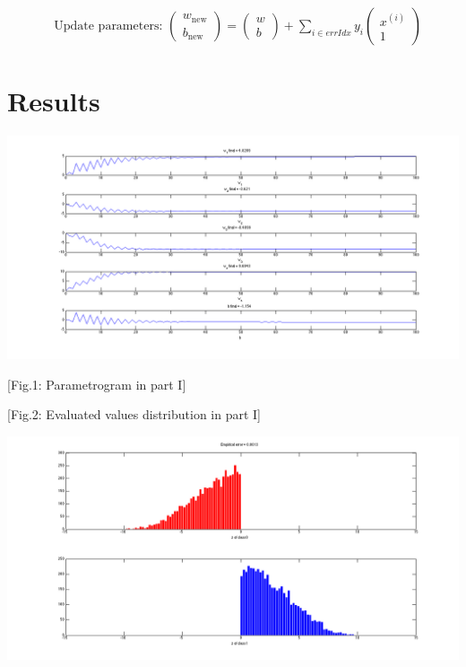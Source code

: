 \documentclass[12pt]{article}
\makeatletter
\renewenvironment{itemize}
{\list{$\bullet$}{\leftmargin\z@ \labelwidth\z@ \itemindent-\leftmargin
\let\makelabel\descriptionlabel}}
{\endlist}
\makeatother
\begin{document}
\begin{enumerate}
\begin{itemize}
\begin{align*}
			&\text{Update parameters}: \, 
			\begin{pmatrix}w_{\text{new}} \\ b_{\text{new}}\end{pmatrix} = 
			\begin{pmatrix}w \\ b\end{pmatrix} + \sum_{i \in errIdx}y_i
			\begin{pmatrix}x^{(i)} \\ 1\end{pmatrix}
		\end{align*}
	\end{itemize}
\end{enumerate}

\section*{Results}
\vspace{-20pt}
\noindent\makebox[\linewidth]{\rule{\textwidth}{0.4pt}}

\hspace*{-14em}
\includegraphics[scale=.6]{../res/part1_parametrogram_init0.png}
\vspace*{-4.5em}
\begin{center}
[Fig.1: Parametrogram in part I]
\end{center}

\vspace*{-4.5em}
\begin{center}
[Fig.2: Evaluated values distribution in part I]
\end{center}
\vspace*{-1em}
\hspace*{-12em}
\includegraphics[scale=.59]{../res/part1_distributionDiag.png}
\end{document}
